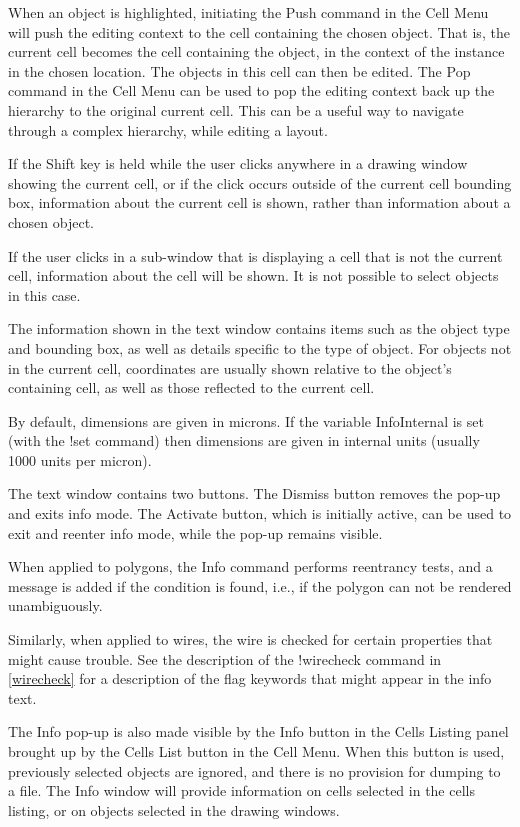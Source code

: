 When an object is highlighted, initiating the {\cb Push} command in
the {\cb Cell Menu} will push the editing context to the cell
containing the chosen object.  That is, the current cell becomes the
cell containing the object, in the context of the instance in the
chosen location.  The objects in this cell can then be edited.  The
{\cb Pop} command in the {\cb Cell Menu} can be used to pop the
editing context back up the hierarchy to the original current cell. 
This can be a useful way to navigate through a complex hierarchy,
while editing a layout.

If the {\kb Shift} key is held while the user clicks anywhere in a
drawing window showing the current cell, or if the click occurs
outside of the current cell bounding box, information about the
current cell is shown, rather than information about a chosen object.

If the user clicks in a sub-window that is displaying a cell that is
not the current cell, information about the cell will be shown.  It is
not possible to select objects in this case.

The information shown in the text window contains items such as the
object type and bounding box, as well as details specific to the type
of object.  For objects not in the current cell, coordinates are
usually shown relative to the object's containing cell, as well as
those reflected to the current cell.

By default, dimensions are given in microns.  If the variable {\et
InfoInternal} is set (with the {\cb !set} command) then dimensions are
given in internal units (usually 1000 units per micron).

The text window contains two buttons.  The {\cb Dismiss} button
removes the pop-up and exits info mode.  The {\cb Activate} button,
which is initially active, can be used to exit and reenter info mode,
while the pop-up remains visible.

When applied to polygons, the {\cb Info} command performs reentrancy
tests, and a message is added if the condition is found, i.e., if the
polygon can not be rendered unambiguously.

Similarly, when applied to wires, the wire is checked for certain
properties that might cause trouble.  See the description of the {\cb
!wirecheck} command in \ref{wirecheck} for a description of the flag
keywords that might appear in the info text.

The {\cb Info} pop-up is also made visible by the {\cb Info} button in
the {\cb Cells Listing} panel brought up by the {\cb Cells List}
button in the {\cb Cell Menu}.  When this button is used, previously
selected objects are ignored, and there is no provision for dumping to
a file.  The {\cb Info} window will provide information on cells
selected in the cells listing, or on objects selected in the drawing
windows.


